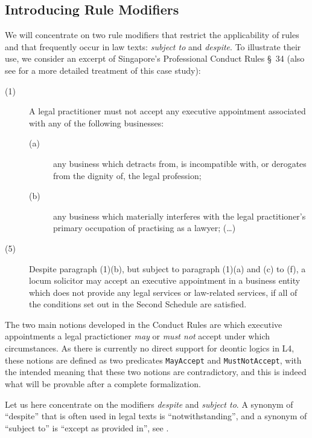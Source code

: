 \subsection{Introducing Rule Modifiers}\label{sec:intro_rule_modifiers}

We will concentrate on two rule modifiers that restrict the applicability of
rules and that frequently occur in law texts: \emph{subject to} and
\emph{despite}. To illustrate their use, we consider an excerpt of Singapore's
Professional Conduct Rules \S~34 \cite{professional_conduct_rules} (also see
\cite{morris21:_const_answer_set_progr_tool} for a more detailed treatment of
this case study):

\begin{description}
\item[(1)] A legal practitioner must not accept any executive appointment
  associated with any of the following businesses: 
  \begin{description}
  \item[(a)] any business which detracts from, is incompatible with, or
    derogates from the dignity of, the legal profession;
  \item[(b)] any business which materially interferes with the legal
    practitioner’s primary occupation of practising as a lawyer; (\dots)
  \end{description}
\item[(5)] Despite paragraph (1)(b), but subject to paragraph (1)(a) and (c)
  to (f), a locum solicitor may accept an executive appointment in a business
  entity which does not provide any legal services or law-related services, if
  all of the conditions set out in the Second Schedule are satisfied.
\end{description}

The two main notions developed in the Conduct Rules are which executive appointments a legal
practictioner \emph{may} or \emph{must not} accept under which
circumstances. As there is currently no direct support for deontic logics in
L4, these notions are defined as two predicates \texttt{MayAccept} and
\texttt{MustNotAccept}, with the intended meaning that these two notions are
contradictory, and this is indeed what will be provable after a complete
formalization.

Let us here concentrate on the modifiers \emph{despite} and \emph{subject
  to}. A synonym of ``despite'' that is often used in legal texts is
``notwithstanding'',  and a synonym of
``subject to'' is ``except as provided in'', see \cite{adams_contract_drafting_2004}.

